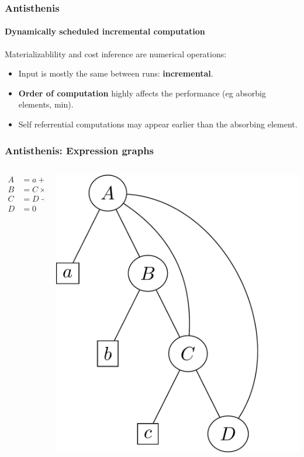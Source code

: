 \begin{frame}
  \frametitle{Antisthenis}
  \framesubtitle{Dynamically scheduled incremental computation}

  Materializablility and cost inference are numerical operations:

  \begin{itemize}
  \item Input is mostly the same between runs: \textbf{incremental}.
  \item \textbf{Order of computation} highly affects the performance
    (eg absorbig elements, min).
  \item Self referrential computations may appear earlier than the
    absorbing element.
  \end{itemize}
\end{frame}


\begin{frame}
  \frametitle{Antisthenis: Expression graphs}
  \begin{columns}
    \begin{column}{0.5\textwidth}
      \begin{align*}
        A &= a + B + C + D  \\
        B &= C \times b \\
        C & = D + c \\
        D &= 0
      \end{align*}
    \end{column}
    \begin{column}{0.5\textwidth}
      \begin{center}
        \includegraphics[height=.6\textheight]{../imgs/example_antisthenis_dag.pdf}
      \end{center}
    \end{column}
  \end{columns}
\end{frame}


